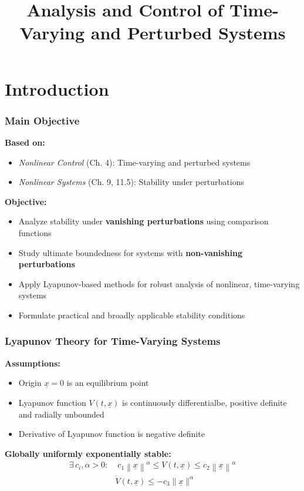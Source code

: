 \documentclass[student, noshadow, lsr, english, aspectratio=169, t]{ITR_LSR_slides}
\title{Analysis and Control of Time-Varying and Perturbed Systems}
\begin{document}
\begin{frame}
    \titlepage
\end{frame}


\section{Introduction}

\begin{frame}
    \frametitle{Main Objective}

    \textbf{Based on:}
    \begin{itemize}
        \item \textit{Nonlinear Control} (Ch. 4): Time-varying and perturbed systems
        \item \textit{Nonlinear Systems} (Ch. 9, 11.5): Stability under perturbations
    \end{itemize}
	\vspace{0.5cm}
    \textbf{Objective:}
    \begin{itemize}
        \item Analyze stability under \textbf{vanishing perturbations} using comparison functions
        \item Study ultimate boundedness for systems with \textbf{non-vanishing perturbations}
        \item Apply Lyapunov-based methods for robust analysis of nonlinear, time-varying systems
        \item Formulate practical and broadly applicable stability conditions
    \end{itemize}
\end{frame}

\begin{frame}
	\frametitle{Lyapunov Theory for Time-Varying Systems}
	\textbf{Assumptions:}
	\begin{itemize}
		\item Origin $\underline{x}=0$ is an equilibrium point
		\item Lyapunov function $V(t,\underline{x})$ is continuously differentialbe, positive definite and radially unbounded
		\item Derivative of Lyapunov function is negative definite
	\end{itemize}
	\vspace{0.5cm}
	\textbf{Globally uniformly exponentially stable:}
	\begin{align*}
		\exists\, c_i, \alpha > 0: & \; c_1\left\|\underline{x}\right\|^\alpha \leq V(t,\underline{x}) \leq c_2\left\|\underline{x}\right\|^\alpha  \\
		& \dot{V}(t,\underline{x}) \leq -c_3\|\underline{x}\|^\alpha
	\end{align*}
\end{frame}
\end{document}
